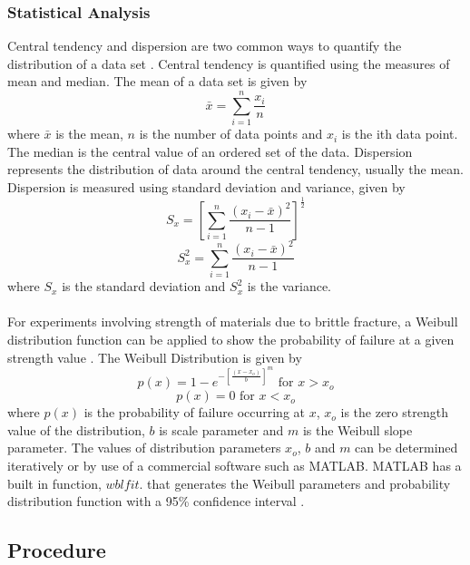 \documentclass[12pt]{article}
\begin{document}
\subsubsection{Statistical Analysis} %

Central tendency and dispersion are two common ways to quantify the distribution of a data set \cite{Shukla}. Central tendency is quantified using the measures of mean and median. The mean of a data set is given by
\begin{equation}
\bar{x} = \sum_{i=1}^{n}\frac{x_{i}}{n}
\end{equation}
where $\bar{x}$ is the mean, $n$ is the number of data points and $x_{i}$ is the ith data point. The median is the central value of an ordered set of the data. Dispersion represents the distribution of data around the central tendency, usually the mean. Dispersion is measured using standard deviation and variance, given by 
\begin{equation}
S_{x} = \left[\sum_{i=1}^{n}\frac{\left(x_{i}-\bar{x}\right)^2}{n-1}\right]^\frac{1}{2}
\end{equation}  
\begin{equation}
S_{x}^2 = \sum_{i=1}^{n}\frac{\left(x_{i}-\bar{x}\right)^2}{n-1}
\end{equation} 
where $S_{x}$ is the standard deviation and $S_{x}^2$ is the variance.
\\ \\
For experiments involving strength of materials due to brittle fracture, a Weibull distribution function can be applied to show the probability of failure at a given strength value \cite{Shukla}. The Weibull Distribution is given by
\begin{equation}
p(x) = 1-e^{-\left[\frac{\left(x-x_{o}\right)}{b}\right]^m} \text{ for } x > x_{o}
\end{equation}
\begin{equation}
p(x) = 0  \text { for } x < x_{o}
\end{equation} 
where $p(x)$ is the probability of failure occurring at $x$, $x_{o}$ is the zero strength value of the distribution, $b$ is scale parameter and $m$ is the Weibull slope parameter. The values of distribution parameters $x_{o}$, $b$ and $m$ can be determined iteratively or by use of a commercial software such as MATLAB. MATLAB has a built in function, $wblfit$. that generates the Weibull parameters and probability distribution function with a 95\% confidence interval \cite{MATLAB}.

\subsection{Procedure} %
\end{document}
